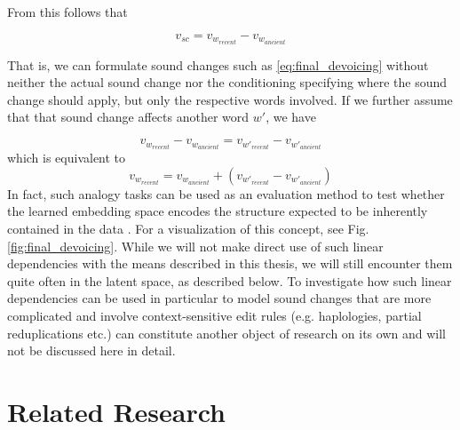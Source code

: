 \documentclass[6pt]{article}
\begin{document}
From this follows that 

\begin{equation}
v_{sc} =  v_{w_{recent}} - v_{w_{ancient}} 
\end{equation}

That is, we can formulate sound changes such as \ref{eq:final_devoicing} without neither the actual sound change nor the conditioning specifying where the sound change should apply, but only the respective words involved.
If we further assume that that sound change affects another word $w'$, we have

\begin{equation}
v_{w_{recent}} - v_{w_{ancient}}  =  v_{w'_{recent}} - v_{w'_{ancient}} 
\end{equation}
which is equivalent to
\begin{equation}
v_{w_{recent}}  =   v_{w_{ancient}}  + (v_{w'_{recent}} - v_{w'_{ancient}}) 
\end{equation}
In fact, such analogy tasks can be used as an evaluation method to test whether the learned embedding space encodes the structure expected to be inherently contained in the data \citep{mikolov2013distributed}. For a visualization of this concept, see Fig. \ref{fig:final_devoicing}. While we will not make direct use of such linear dependencies with the means described in this thesis, we will still encounter them quite often in the latent space, as described below. To investigate how such linear dependencies can be used in particular to model sound changes that are more complicated and involve context-sensitive edit rules (e.g. haplologies, partial reduplications etc.) can constitute another object of  research on its own and will not be discussed here in detail. 
 

\section{Related Research}
\end{document}
